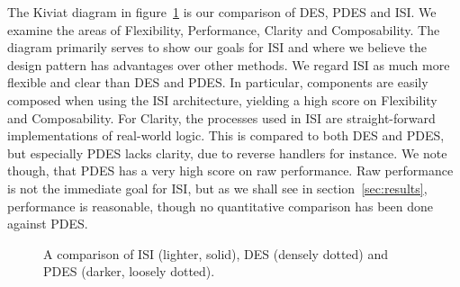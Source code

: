 The Kiviat diagram in figure~\ref{kiviat} is our comparison of DES, PDES and ISI. We
examine the areas of Flexibility, Performance, Clarity and Composability. The
diagram primarily serves to show our goals for ISI and where we believe the
design pattern has advantages over other methods. We regard ISI as much more
flexible and clear than DES and PDES. In particular, components are easily
composed when using the ISI architecture, yielding a high score on Flexibility
and Composability. For Clarity, the processes used in ISI are straight-forward
implementations of real-world logic. This is compared to both DES and PDES, but
especially PDES lacks clarity, due to reverse handlers for instance. We note
though, that PDES has a very high score on raw performance. Raw performance is
not the immediate goal for ISI, but as we shall see in
section~\ref{sec:results}, performance is reasonable, though no
quantitative comparison has been done against PDES.


\begin{figure}[htb]
\caption{A comparison of ISI (lighter, solid), DES (densely
	dotted) and PDES (darker, loosely dotted).}
\label{kiviat}
\end{figure}


